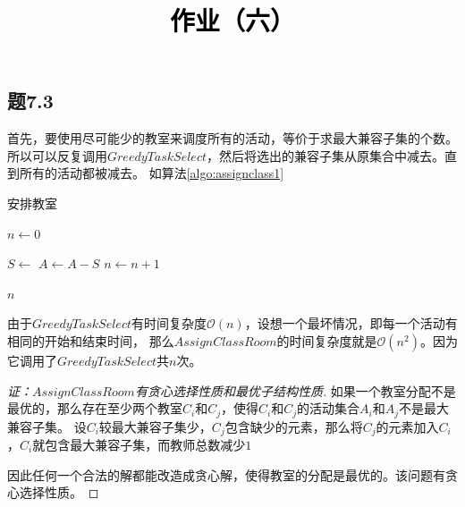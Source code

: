 \documentclass[a4paper,twoside]{article}
\newcommand{\PaperTitle}{作业（六）}  %
\begin{document}
\newpage

\title{
	\Large{\textcolor{black}{\PaperTitle}}
}
	
	
\maketitle
	
\tableofcontents
 
\newpage
\setcounter{page}{1}

\begin{spacing}{1.2}

\section{题7.3}

首先，要使用尽可能少的教室来调度所有的活动，等价于求最大兼容子集的个数。
所以可以反复调用$GreedyTaskSelect$，然后将选出的兼容子集从原集合中减去。直到所有的活动都被减去。
如算法\ref{algo:assignclass1}

\begin{algorithm}
	\caption{安排教室}
	\label{algo:assignclass1}
	\begin{algorithmic}[1]
		
		
		\State $n\gets 0$

		\State $S \gets$ 
		\State $A\gets A-S$
		\State $n\gets n+1$
		\EndWhile

		\State \Return $n$
		
		\EndProcedure
	\end{algorithmic}
\end{algorithm}	

由于$GreedyTaskSelect$有时间复杂度$\mathcal{O}(n)$，设想一个最坏情况，即每一个活动有相同的开始和结束时间，
那么$AssignClassRoom$的时间复杂度就是$\mathcal{O}(n^2)$。因为它调用了$GreedyTaskSelect$共$n$次。

\begin{proof}[证：$AssignClassRoom$有贪心选择性质和最优子结构性质]
	
如果一个教室分配不是最优的，那么存在至少两个教室$C_i$和$C_j$，使得$C_i$和$C_j$的活动集合$A_i$和$A_j$不是最大兼容子集。
设$C_i$较最大兼容子集少，$C_j$包含缺少的元素，那么将$C_j$的元素加入$C_i$，$C_i$就包含最大兼容子集，而教师总数减少$1$

因此任何一个合法的解都能改造成贪心解，使得教室的分配是最优的。该问题有贪心选择性质。


\end{proof}
\end{spacing}
\end{document}
